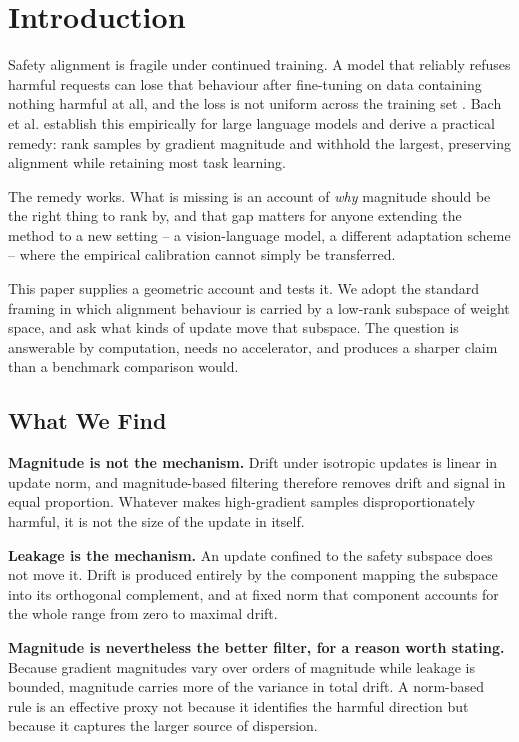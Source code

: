 \documentclass{article}
\begin{document}
\section{Introduction}


Safety alignment is fragile under continued training. A model that reliably refuses harmful requests can lose that behaviour after fine-tuning on data containing nothing harmful at all, and the loss is not uniform across the training set \cite{arxiv_2604_17215}. Bach et al. establish this empirically for large language models and derive a practical remedy: rank samples by gradient magnitude and withhold the largest, preserving alignment while retaining most task learning.

The remedy works. What is missing is an account of \textit{why} magnitude should be the right thing to rank by, and that gap matters for anyone extending the method to a new setting -- a vision-language model, a different adaptation scheme -- where the empirical calibration cannot simply be transferred.

This paper supplies a geometric account and tests it. We adopt the standard framing in which alignment behaviour is carried by a low-rank subspace of weight space, and ask what kinds of update move that subspace. The question is answerable by computation, needs no accelerator, and produces a sharper claim than a benchmark comparison would.


\subsection{What We Find}


\textbf{Magnitude is not the mechanism.} Drift under isotropic updates is linear in update norm, and magnitude-based filtering therefore removes drift and signal in equal proportion. Whatever makes high-gradient samples disproportionately harmful, it is not the size of the update in itself.

\textbf{Leakage is the mechanism.} An update confined to the safety subspace does not move it. Drift is produced entirely by the component mapping the subspace into its orthogonal complement, and at fixed norm that component accounts for the whole range from zero to maximal drift.

\textbf{Magnitude is nevertheless the better filter, for a reason worth stating.} Because gradient magnitudes vary over orders of magnitude while leakage is bounded, magnitude carries more of the variance in total drift. A norm-based rule is an effective proxy not because it identifies the harmful direction but because it captures the larger source of dispersion.
\end{document}
